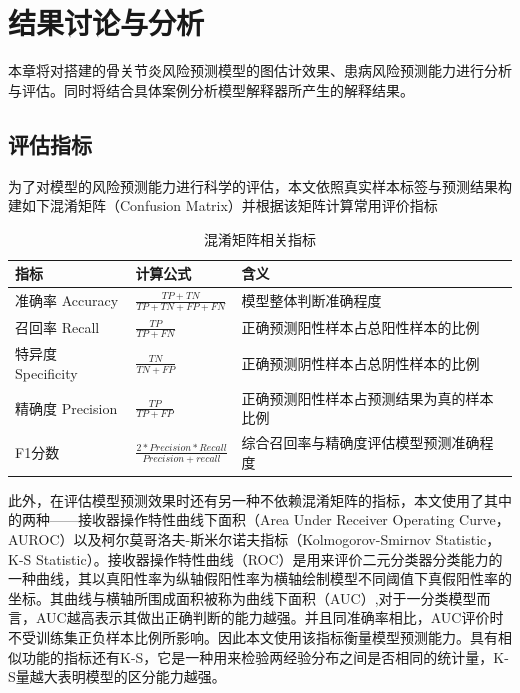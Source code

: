 \chapter{结果讨论与分析}
本章将对搭建的骨关节炎风险预测模型的图估计效果、患病风险预测能力进行分析与评估。同时将结合具体案例分析模型解释器所产生的解释结果。
\section{评估指标}
为了对模型的风险预测能力进行科学的评估，本文依照真实样本标签与预测结果构建如下混淆矩阵（Confusion Matrix）并根据该矩阵计算常用评价指标\cite{gaudillo_machine_2019}
\begin{table}[!h]
	\renewcommand{\arraystretch}{1.2}
	\centering\wuhao
	\caption{混淆矩阵相关指标} \label{ICD_exclude} \vspace{2mm}
	\begin{tabularx}{\textwidth} { 
   >{\centering\arraybackslash}X 
   >{\centering\arraybackslash}X
   >{\centering\arraybackslash}X}
	\toprule[1.5pt]
		指标 & 计算公式 & 含义 \\
	\midrule[1pt]
		准确率 Accuracy & $\frac{TP+TN}{TP+TN+FP+FN}$ & 模型整体判断准确程度 \\
        召回率 Recall & $\frac{TP}{TP+FN}$ &
        正确预测阳性样本占总阳性样本的比例 \\
        特异度 Specificity & $\frac{TN}{TN+FP}$ &
        正确预测阴性样本占总阴性样本的比例 \\
        精确度 Precision & $\frac{TP}{TP+FP}$ &
        正确预测阳性样本占预测结果为真的样本比例 \\
        F1分数 & $\frac{2*Precision*Recall}{Precision+recall}$ &
        综合召回率与精确度评估模型预测准确程度 \\
	\bottomrule[1.5pt]
	\end{tabularx}
\end{table}
此外，在评估模型预测效果时还有另一种不依赖混淆矩阵的指标，本文使用了其中的两种——接收器操作特性曲线下面积（Area Under Receiver Operating Curve，AUROC）以及柯尔莫哥洛夫-斯米尔诺夫指标（Kolmogorov-Smirnov Statistic，K-S Statistic）。接收器操作特性曲线（ROC）是用来评价二元分类器分类能力的一种曲线，其以真阳性率为纵轴假阳性率为横轴绘制模型不同阈值下真假阳性率的坐标。其曲线与横轴所围成面积被称为曲线下面积（AUC）,对于一分类模型而言，AUC越高表示其做出正确判断的能力越强。\cite{fawcett_introduction_2006}并且同准确率相比，AUC评价时不受训练集正负样本比例所影响。\cite{zou_receiver-operating_2007}因此本文使用该指标衡量模型预测能力。具有相似功能的指标还有K-S\cite{naaman_tight_2021}，它是一种用来检验两经验分布之间是否相同的统计量，K-S量越大表明模型的区分能力越强。
